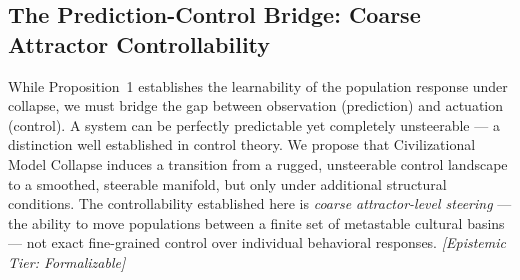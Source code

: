 \documentclass[11pt, a4paper]{article}
\theoremstyle{remark}
\begin{document}
\subsection{The Prediction-Control Bridge: Coarse Attractor Controllability}\label{sec:prediction-control}

While Proposition~1 establishes the learnability of the population response under collapse, we must bridge the gap between observation (prediction) and actuation (control). A system can be perfectly predictable yet completely unsteerable --- a distinction well established in control theory. We propose that Civilizational Model Collapse induces a transition from a rugged, unsteerable control landscape to a smoothed, steerable manifold, but only under additional structural conditions. The controllability established here is \emph{coarse attractor-level steering} --- the ability to move populations between a finite set of metastable cultural basins --- not exact fine-grained control over individual behavioral responses. \textit{[Epistemic Tier: Formalizable]}
\end{document}
